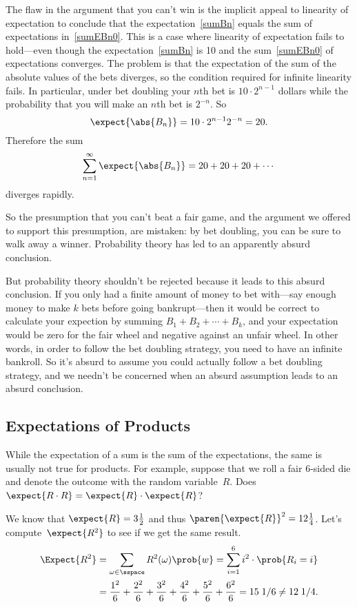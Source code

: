 The flaw in the argument that you can't win is the implicit appeal to
linearity of expectation to conclude that the
expectation~\eqref{sumBn} equals the sum of expectations
in~\eqref{sumEBn0}.  This is a case where linearity of expectation
fails to hold---even though the expectation~\eqref{sumBn} is 10 and
the sum~\eqref{sumEBn0} of expectations converges.  The problem is
that the expectation of the sum of the absolute values of the bets
diverges, so the condition required for infinite linearity fails.  In
particular, under bet doubling your $n$th bet is $10 \cdot 2^{n-1}$
dollars while the probability that you will make an $n$th bet is
$2^{-n}$.  So
\[
\expect{\abs{B_n}} = 10 \cdot 2^{n-1} 2^{-n} = 20.
\]
Therefore the sum
\[
\sum_{n = 1}^\infty \expect{\abs{B_n}} = 20 + 20 +20 + \cdots
\]
diverges rapidly.

So the presumption that you can't beat a fair game, and the argument
we offered to support this presumption, are mistaken: by bet doubling,
you can be sure to walk away a winner.  Probability theory has led to
an apparently absurd conclusion.

But probability theory shouldn't be rejected because it leads to this
absurd conclusion.  If you only had a finite amount of money to bet
with---say enough money to make $k$ bets before going bankrupt---then
it would be correct to calculate your expection by summing
$B_1+B_2+\cdots+B_k$, and your expectation would be zero for the fair
wheel and negative against an unfair wheel.  In other words, in order
to follow the bet doubling strategy, you need to have an infinite
bankroll.  So it's absurd to assume you could actually follow a bet
doubling strategy, and we needn't be concerned when an absurd
assumption leads to an absurd conclusion.

\subsection{Expectations of Products}

While the expectation of a sum is the sum of the expectations, the same is
usually not true for products.  For example, suppose that we roll a
fair 6-sided die and denote the outcome with the random variable~$R$.
Does $\expect{R \cdot R} = \expect{R} \cdot \expect{R}$?

We know that $\expect{R} = 3\frac{1}{2}$ and thus $\paren{\expect{R}}^2 =
12\frac{1}{4}$.  Let's compute~$\expect{R^2}$ to see if we get the same
result.
\begin{align*}
\Expect{R^2}
   & = \sum_{\omega \in \sspace} R^2(\omega) \prob{w}
     = \sum_{i=1}^6 i^2 \cdot \prob{R_i = i} \\
   & = \frac{1^2}{6} + \frac{2^2}{6} + \frac{3^2}{6} +
            \frac{4^2}{6} + \frac{5^2}{6} + \frac{6^2}{6} 
     =  15\; 1/6 \neq  12 \; 1/4.
\end{align*}

